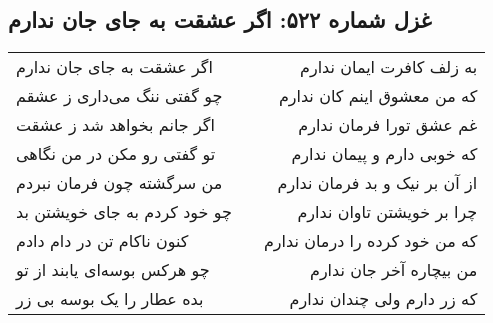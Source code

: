 \begin{center}
\section*{غزل شماره ۵۲۲: اگر عشقت به جای جان ندارم}
\label{sec:522}
\begin{longtable}{l p{0.5cm} r}
اگر عشقت به جای جان ندارم
&&
به زلف کافرت ایمان ندارم
\\
چو گفتی ننگ می‌داری ز عشقم
&&
که من معشوق اینم کان ندارم
\\
اگر جانم بخواهد شد ز عشقت
&&
غم عشق تورا فرمان ندارم
\\
تو گفتی رو مکن در من نگاهی
&&
که خوبی دارم و پیمان ندارم
\\
من سرگشته چون فرمان نبردم
&&
از آن بر نیک و بد فرمان ندارم
\\
چو خود کردم به جای خویشتن بد
&&
چرا بر خویشتن تاوان ندارم
\\
کنون ناکام تن در دام دادم
&&
که من خود کرده را درمان ندارم
\\
چو هرکس بوسه‌ای یابند از تو
&&
من بیچاره آخر جان ندارم
\\
بده عطار را یک بوسه بی زر
&&
که زر دارم ولی چندان ندارم
\\
\end{longtable}
\end{center}
